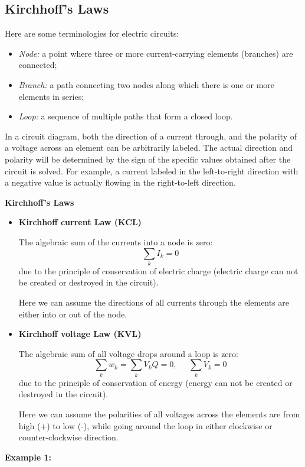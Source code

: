 \begin{itemize}
\subsection*{Kirchhoff's Laws}

Here are some terminologies for electric circuits:
\begin{itemize}
\item {\em Node:} a point where three or more current-carrying elements 
  (branches) are connected;
\item {\em Branch:} a path connecting two nodes along which there is 
  one or more elements in series; 
\item {\em Loop:} a sequence of multiple paths that form a closed loop.
\end{itemize}

In a circuit diagram, both the direction of a current through, and the
polarity of a voltage across an element can be arbitrarily labeled. 
The actual direction and polarity will be determined by the sign of 
the specific values obtained after the circuit is solved. For example, 
a current labeled in the left-to-right direction with a negative value
is actually flowing in the right-to-left direction.

{\bf Kirchhoff's Laws}
\begin{itemize}
\item {\bf Kirchhoff current Law (KCL)} 

  The algebraic sum of the currents into a node is zero:
  \[
  \sum_k I_k=0	
  \]
  due to the principle of conservation of electric charge (electric
  charge can not be created or destroyed in the circuit).  

  Here we can assume the directions of all currents through the elements
  are either into or out of the node.

\item {\bf Kirchhoff voltage Law (KVL)} 

  The algebraic sum of all voltage drops around a loop is zero:
  \[ 
  \sum_k w_k=\sum_k V_k Q=0,\;\;\;\;\;  \sum_k V_k=0	
  \]
  due to the principle of conservation of energy (energy can not be
  created or destroyed in the circuit).
  
  Here we can assume the polarities of all voltages across the elements
  are from high (+) to low (-), while going around the loop in either 
  clockwise or counter-clockwise direction.
\end{itemize}

{\bf Example 1:}


\end{itemize}
